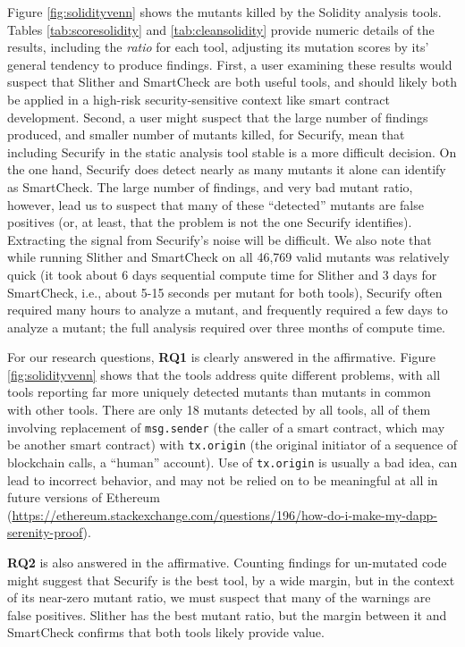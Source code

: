 Figure \ref{fig:solidityvenn} shows the mutants killed by the Solidity analysis tools.  Tables \ref{tab:scoresolidity} and \ref{tab:cleansolidity} provide numeric details of the results, including the \emph{ratio} for each tool, adjusting its mutation scores by its' general tendency to produce findings.  First, a user examining these results would suspect that Slither and SmartCheck are both useful tools, and should likely both be applied in a high-risk security-sensitive context like smart contract development.  Second, a user might suspect that the large number of findings produced, and smaller number of mutants killed, for Securify, mean that including Securify in the static analysis tool stable is a more difficult decision.  On the one hand, Securify does detect nearly as many mutants it alone can identify as SmartCheck.  The large number of findings, and very bad mutant ratio, however, lead us to suspect that many of these ``detected'' mutants are false positives (or, at least, that the problem is not the one Securify identifies).  Extracting the signal from Securify's noise will be difficult.  We also note that while running Slither and SmartCheck on all 46,769 valid mutants was relatively quick (it took about 6 days sequential compute time for Slither and 3 days for SmartCheck, i.e., about 5-15 seconds per mutant for both tools), Securify often required many hours to analyze a mutant, and frequently required a few days to analyze a mutant; the full analysis required over three months of compute time.

For our research questions, {\bf RQ1} is clearly answered in the affirmative.  Figure \ref{fig:solidityvenn} shows that the tools address quite different problems, with all tools reporting far more uniquely detected mutants than mutants in common with other tools.  There are only 18 mutants detected by all tools, all of them involving replacement of {\tt msg.sender} (the caller of a smart contract, which may be another smart contract) with {\tt tx.origin} (the original initiator of a sequence of blockchain calls, a ``human'' account).  Use of {\tt tx.origin} is usually a bad idea, can lead to incorrect behavior, and may not be relied on to be meaningful at all in future versions of Ethereum (\url{https://ethereum.stackexchange.com/questions/196/how-do-i-make-my-dapp-serenity-proof}).  

{\bf RQ2} is also answered in the affirmative.  Counting findings for un-mutated code might suggest that Securify is the best tool, by a wide margin, but in the context of its near-zero mutant ratio, we must suspect that many of the warnings are false positives.  Slither has the best mutant ratio, but the margin between it and SmartCheck confirms that both tools likely provide value.

